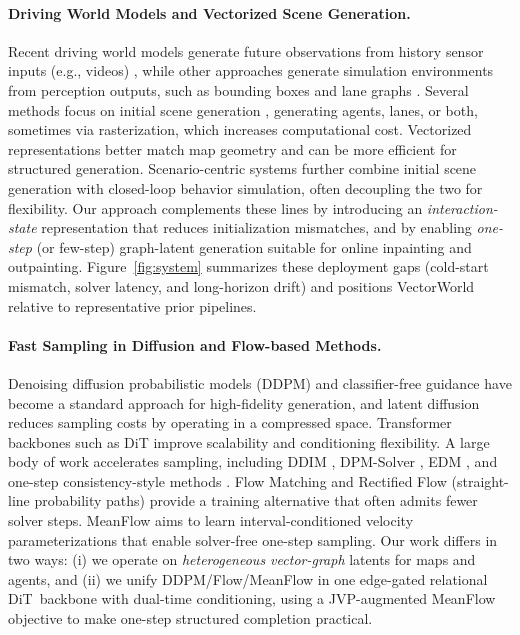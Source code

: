 \documentclass{article}
\newcommand{\EdgeDiT}{edge-gated relational DiT}
\theoremstyle{plain}
\theoremstyle{definition}
\theoremstyle{remark}
\begin{document}
\paragraph{Driving World Models and Vectorized Scene Generation.}
Recent driving world models generate future observations from history sensor inputs (e.g., videos) \cite{gao2024vista,chen2025drivinggpt,ni2025maskgwm}, while other approaches generate simulation environments from perception outputs, such as bounding boxes and lane graphs \cite{chitta2024sledge,sun2024drivescenegen,jiang2024scenediffuser,tan2025scenediffuserpp}. Several methods focus on initial scene generation \cite{rowe2025scenario}, generating agents, lanes, or both, sometimes via rasterization, which increases computational cost. Vectorized representations \cite{jiang2023vad,chen2024vadv2} better match map geometry and can be more efficient for structured generation. Scenario-centric systems further combine initial scene generation with closed-loop behavior simulation, often decoupling the two for flexibility. Our approach complements these lines by introducing an \emph{interaction-state} representation that reduces initialization mismatches, and by enabling \emph{one-step} (or few-step) graph-latent generation suitable for online inpainting and outpainting. Figure~\ref{fig:system} summarizes these deployment gaps (cold-start mismatch, solver latency, and long-horizon drift) and positions VectorWorld relative to representative prior pipelines.


\paragraph{Fast Sampling in Diffusion and Flow-based Methods.}
Denoising diffusion probabilistic models (DDPM) \cite{ho2020denoising} and classifier-free guidance \cite{ho2022classifier} have become a standard approach for high-fidelity generation, and latent diffusion \cite{podell2023sdxl} reduces sampling costs by operating in a compressed space. Transformer backbones such as DiT \cite{peebles2023scalable} improve scalability and conditioning flexibility. A large body of work accelerates sampling, including DDIM \cite{song2020denoising}, DPM-Solver \cite{lu2022dpm}, EDM \cite{karras2022elucidating}, and one-step consistency-style methods \cite{song2023consistency}. Flow Matching \cite{lipman2022flow} and Rectified Flow (straight-line probability paths) \cite{lee2024improving} provide a training alternative that often admits fewer solver steps. MeanFlow \cite{geng2025mean} aims to learn interval-conditioned velocity parameterizations that enable solver-free one-step sampling.
Our work differs in two ways: (i) we operate on \emph{heterogeneous vector-graph} latents for maps and agents, and (ii) we unify DDPM/Flow/MeanFlow in one \EdgeDiT\ backbone with dual-time conditioning, using a JVP-augmented MeanFlow objective to make one-step structured completion practical.
\end{document}
